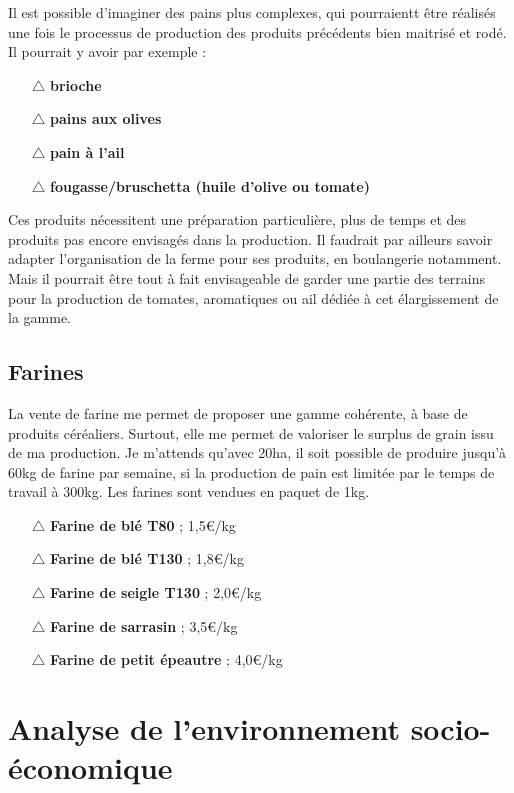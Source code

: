 \documentclass{book}
\begin{document}
Il est possible d’imaginer des pains plus complexes, qui pourraientt être réalisés une fois le processus de production des produits précédents bien maitrisé et rodé. Il pourrait y avoir par exemple :
\begin{itemize}

	\item[$\triangle$] \textbf{brioche}
	\item[$\triangle$] \textbf{pains aux olives}
	\item[$\triangle$] \textbf{pain à l’ail}
	\item[$\triangle$] \textbf{fougasse/bruschetta (huile d’olive ou tomate)}

\end{itemize}
Ces produits nécessitent une préparation particulière, plus de temps et des produits pas encore envisagés dans la production. Il faudrait par ailleurs savoir adapter l’organisation de la ferme pour ses produits, en boulangerie notamment. Mais il pourrait être tout à fait envisageable de garder une partie des terrains pour la production de tomates, aromatiques ou ail dédiée à cet élargissement de la gamme.

\subsection{Farines}

La vente de farine me permet de proposer une gamme cohérente, à base de produits céréaliers. Surtout, elle me permet de valoriser le surplus de grain issu de ma production. Je m'attends qu'avec 20ha, il soit possible de produire jusqu'à 60kg de farine par semaine, si la production de pain est limitée par le temps de travail à 300kg. Les farines sont vendues en paquet de 1kg.
\begin{itemize}

	\item[$\triangle$] \textbf{Farine de blé T80}  ; 1,5\euro{}/kg
	\item[$\triangle$] \textbf{Farine de blé T130} ; 1,8\euro{}/kg
	\item[$\triangle$] \textbf{Farine de seigle T130} ; 2,0\euro{}/kg
	\item[$\triangle$] \textbf{Farine de sarrasin} ; 3,5\euro{}/kg
	\item[$\triangle$] \textbf{Farine de petit épeautre} ; 4,0\euro{}/kg

\end{itemize}

\section{Analyse de l'environnement socio-économique}
\end{document}
